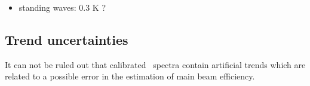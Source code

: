 \begin{itemize}

 If we for the moment assume \(\Delta T_{sp}\)=0 (see Sect.~\ref{sec:trends} for further
 analysis), and focus on the \(\Delta T_{amb}\) term.
 There is no temperature sensor on \smr\ that measure the baffle temperature, and a constant
 value of 300\,K is used in calibration process.
 Anyhow, for  observations against a blank backgrund the error
 is close to 0, while if \(T_{a}\)=200\,K, \(T_{amb}\)=300\,K, \(T_{sp}\)=8\,K,
 and \(\Delta T_{amb}\)=10\,K, than \(\Delta T_{a}\)\(\approx\)\,0.18 K.



\item standing waves: 0.3 K ?


\end{itemize}


\subsection{Trend uncertainties}
\label{sec:trends}
It can not be ruled out that calibrated \smr\ spectra
contain artificial trends which are related to a
possible error in the estimation of main beam efficiency.


